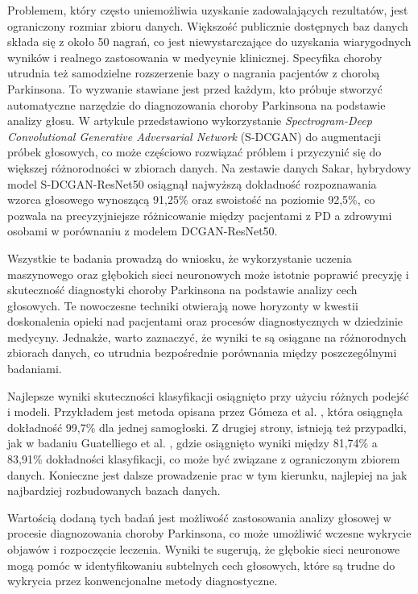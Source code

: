 Problemem, który często uniemożliwia uzyskanie zadowalających rezultatów, jest ograniczony rozmiar zbioru danych.
Większość publicznie dostępnych baz danych składa się z około 50 nagrań, co jest niewystarczające do uzyskania wiarygodnych wyników i
realnego zastosowania w medycynie klinicznej. Specyfika choroby utrudnia też samodzielne rozszerzenie bazy o nagrania pacjentów z chorobą Parkinsona.
To wyzwanie stawiane jest przed każdym, kto próbuje stworzyć automatyczne narzędzie do diagnozowania choroby Parkinsona na podstawie analizy głosu.
W artykule \cite{9257451} przedstawiono wykorzystanie \emph{Spectrogram-Deep Convolutional Generative Adversarial Network} (S-DCGAN) do
augmentacji próbek głosowych, co może częściowo rozwiązać próblem i przyczynić się do większej różnorodności w zbiorach danych.
Na zestawie danych Sakar, hybrydowy model S-DCGAN-ResNet50 osiągnął najwyższą dokładność rozpoznawania wzorca głosowego wynoszącą 91,25\%
oraz swoistość na poziomie 92,5\%, co pozwala na precyzyjniejsze różnicowanie między pacjentami z PD a zdrowymi osobami w porównaniu z modelem
DCGAN-ResNet50.

Wszystkie te badania prowadzą do wniosku, że wykorzystanie uczenia maszynowego oraz głębokich sieci neuronowych może istotnie poprawić precyzję
i skuteczność diagnostyki choroby Parkinsona na podstawie analizy cech głosowych.
Te nowoczesne techniki otwierają nowe horyzonty w kwestii doskonalenia opieki nad pacjentami oraz procesów diagnostycznych w dziedzinie medycyny.
Jednakże, warto zaznaczyć, że wyniki te są osiągane na różnorodnych zbiorach danych, co utrudnia bezpośrednie porównania między poszczególnymi badaniami.

Najlepsze wyniki skuteczności klasyfikacji osiągnięto przy użyciu różnych podejść i modeli.
Przykładem jest metoda opisana przez Gómeza et al. \cite{8999815}, która osiągnęła dokładność 99,7\% dla jednej samogłoski.
Z drugiej strony, istnieją też przypadki, jak w badaniu Guatelliego et al. \cite{GUATELLI2023106700}, gdzie osiągnięto wyniki między
81,74\% a 83,91\% dokładności klasyfikacji, co może być związane z ograniczonym zbiorem danych.
Konieczne jest dalsze prowadzenie prac w tym kierunku, najlepiej na jak najbardziej rozbudowanych bazach danych.

Wartością dodaną tych badań jest możliwość zastosowania analizy głosowej w procesie diagnozowania choroby Parkinsona, co może umożliwić
wczesne wykrycie objawów i rozpoczęcie leczenia. Wyniki te sugerują, że głębokie sieci neuronowe mogą pomóc w identyfikowaniu subtelnych cech
głosowych, które są trudne do wykrycia przez konwencjonalne metody diagnostyczne.

